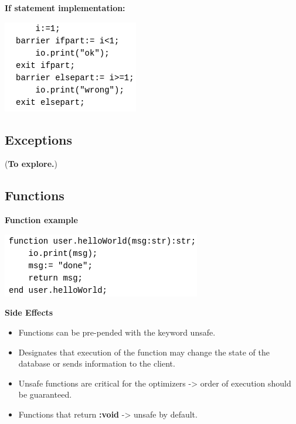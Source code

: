 \documentclass[11pt]{article}
\begin{document}
\textbf{If statement implementation:}
\begin{center}
\includegraphics[width=.9\linewidth]{./Pictures/if-ex.png}
\end{center}

\subsection{Exceptions}
\label{sec:orgbf772d1}

(\textbf{To explore.})

\subsection{Functions}
\label{sec:org75cd120}

\textbf{Function example}
\begin{center}
\includegraphics[width=.9\linewidth]{./Pictures/fun-ex.png}
\end{center}

\textbf{Side Effects}
\begin{itemize}
\item Functions can be pre-pended with the keyword unsafe.
\item Designates that execution of the function may change the state of the database or sends information to the client.
\item Unsafe functions are critical for the optimizers -> order of execution should be guaranteed.
\item Functions that return \textbf{:void} -> unsafe by default.
\end{itemize}
\end{document}
